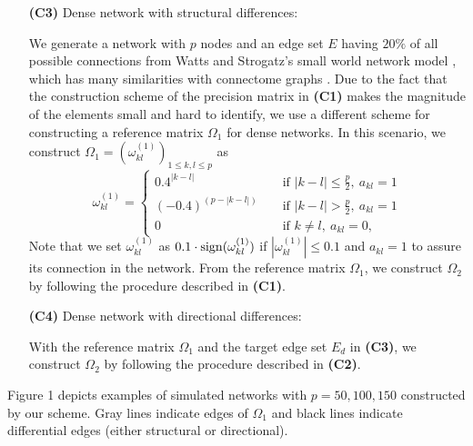 \documentclass[useAMS,usenatbib,referee]{bio}
\begin{document}
{\begin{itemize}
\item[{\bf (C3)}] Dense network with structural differences:

We generate a network with $p$ nodes and an edge set $E$ having $20\%$ of all possible connections from Watts and Strogatz's small world network model \citep{Watts:1998}, which has many similarities with connectome graphs \citep{Eguiuz2005}.
Due to the fact that the construction scheme of the precision matrix in {\bf (C1)}
makes the magnitude of the elements small and hard to identify,
we use a different scheme for constructing a reference matrix $\Omega_1$ for dense networks.
In this scenario, we construct  
$\Omega_1 = (\omega^{(1)}_{kl})_{1\le k,l \le p}$
as \begin{equation} \nonumber
\omega^{(1)}_{kl} = \left\{ \begin{array}{lll}
0.4^{|k-l|} & & \mbox{ if } |k-l|\le \frac{p}{2},~ a_{kl}=1\\
(-0.4)^{(p-|k-l|)}& &  \mbox{ if } |k-l| > \frac{p}{2},~ a_{kl}=1\\
0 & & \mbox{ if } k \neq l, ~a_{kl}=0,
\end{array}
\right.
\end{equation}
Note that we set $\omega^{(1)}_{kl}$ as $0.1 \cdot {\rm sign}(\omega^{(1)}_{kl})$
if $|\omega^{(1)}_{kl}| \le 0.1$ and $a_{kl}=1$ to assure its connection in the network. 
From the reference matrix $\Omega_1$, we construct $\Omega_2$ by following the procedure described in {\bf (C1)}.

 
\item[{\bf (C4)}] Dense network with directional differences:

With the  reference matrix $\Omega_1$ and the target edge set $E_d$ in {\bf (C3)}, we construct $\Omega_2$ by following the procedure described in {\bf (C2)}.

\end{itemize}

\noindent Figure 1 depicts examples of simulated networks with $p=50, 100, 150$ constructed by our scheme. Gray lines indicate edges of $\Omega_1$ and black lines indicate differential edges (either structural or directional).

}
\end{document}
